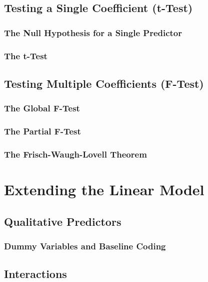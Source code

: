 \subsection{Testing a Single Coefficient (t-Test)}

\subsubsection{The Null Hypothesis for a Single Predictor}

\subsubsection{The t-Test}

\subsection{Testing Multiple Coefficients (F-Test)}

\subsubsection{The Global F-Test}

\subsubsection{The Partial F-Test}

\subsubsection{The Frisch-Waugh-Lovell Theorem}

\section{Extending the Linear Model}

\subsection{Qualitative Predictors}

\subsubsection{Dummy Variables and Baseline Coding}

\subsection{Interactions}

